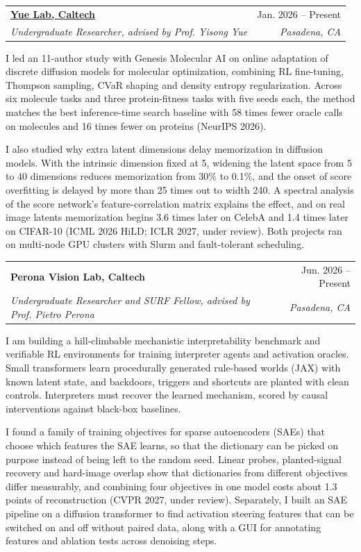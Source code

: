 \documentclass[letterpaper,10pt]{article}
\makeatletter
\newif\ifafterhead
\newcommand{\cvEntry}[4]{%
  \par\ifafterhead\vspace{5.2pt}\else\vspace{5pt}\fi\global\afterheadfalse\hspace*{0.15in}%
  \begin{tabular*}{0.97\textwidth}[t]{l@{\extracolsep{\fill}}r}
    \textbf{#1} & #2 \\
    \textit{\small #3} & \textit{\small #4} \\
  \end{tabular*}\par\nopagebreak\vspace{-0.2pt}\nopagebreak}
\makeatother
\begin{document}
\cvEntry{\href{https://www.yisongyue.com/research}{Yue Lab, Caltech}}{Jan. 2026 -- Present}
  {Undergraduate Researcher, advised by Prof. Yisong Yue}{Pasadena, CA}
\begin{cvBody}
I led an 11-author study with Genesis Molecular AI on online adaptation of discrete diffusion models for molecular optimization, combining RL fine-tuning, Thompson sampling, CVaR shaping and density entropy regularization. Across six molecule tasks and three protein-fitness tasks with five seeds each, the method matches the best inference-time search baseline with 58 times fewer oracle calls on molecules and 16 times fewer on proteins (NeurIPS 2026).

I also studied why extra latent dimensions delay memorization in diffusion models. With the intrinsic dimension fixed at 5, widening the latent space from 5 to 40 dimensions reduces memorization from 30\% to 0.1\%, and the onset of score overfitting is delayed by more than 25 times out to width 240. A spectral analysis of the score network's feature-correlation matrix explains the effect, and on real image latents memorization begins 3.6 times later on CelebA and 1.4 times later on CIFAR-10 (ICML 2026 HiLD; ICLR 2027, under review). Both projects ran on multi-node GPU clusters with Slurm and fault-tolerant scheduling.
\end{cvBody}

\cvEntry{Perona Vision Lab, Caltech}{Jun. 2026 -- Present}
  {Undergraduate Researcher and SURF Fellow, advised by Prof. Pietro Perona}{Pasadena, CA}
\begin{cvBody}
I am building a hill-climbable mechanistic interpretability benchmark and verifiable RL environments for training interpreter agents and activation oracles. Small transformers learn procedurally generated rule-based worlds (JAX) with known latent state, and backdoors, triggers and shortcuts are planted with clean controls. Interpreters must recover the learned mechanism, scored by causal interventions against black-box baselines.

I found a family of training objectives for sparse autoencoders (SAEs) that choose which features the SAE learns, so that the dictionary can be picked on purpose instead of being left to the random seed. Linear probes, planted-signal recovery and hard-image overlap show that dictionaries from different objectives differ measurably, and combining four objectives in one model costs about 1.3 points of reconstruction (CVPR 2027, under review). Separately, I built an SAE pipeline on a diffusion transformer to find activation steering features that can be switched on and off without paired data, along with a GUI for annotating features and ablation tests across denoising steps.
\end{cvBody}
\end{document}
